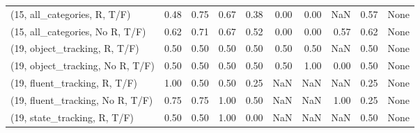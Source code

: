 \begin{table*}[h!]
\begin{adjustbox}{width=2\columnwidth,center}
\begin{tabular}{lrrr|rrr|rrr}
(15, all\_categories, R, T/F)          &                      0.48 &                  0.75 &                      0.67 &                          0.38 &                      0.00 &                          0.00 &                                    NaN &                               0.57 &                                  None \\
(15, all\_categories, No R, T/F)       &                      0.62 &                  0.71 &                      0.67 &                          0.52 &                      0.00 &                          0.00 &                                   0.57 &                               0.62 &                                  None \\



\midrule
(19, object\_tracking, R, T/F)         &                      0.50 &                  0.50 &                      0.50 &                          0.50 &                      0.50 &                          0.50 &                                    NaN &                               0.50 &                                  None \\
(19, object\_tracking, No R, T/F)      &                      0.50 &                  0.50 &                      0.50 &                          0.50 &                      0.50 &                          1.00 &                                   0.00 &                               0.50 &                                  None \\
(19, fluent\_tracking, R, T/F)         &                      1.00 &                  0.50 &                      0.50 &                          0.25 &                       NaN &                           NaN &                                    NaN &                               0.25 &                                  None \\
(19, fluent\_tracking, No R, T/F)      &                      0.75 &                  0.75 &                      1.00 &                          0.50 &                       NaN &                           NaN &                                   1.00 &                               0.25 &                                  None \\
(19, state\_tracking, R, T/F)          &                      0.50 &                  0.50 &                      1.00 &                          0.00 &                       NaN &                           NaN &                                    NaN &                               0.50 &                                  None \\

\end{tabular}
\end{adjustbox}
\end{table*}
